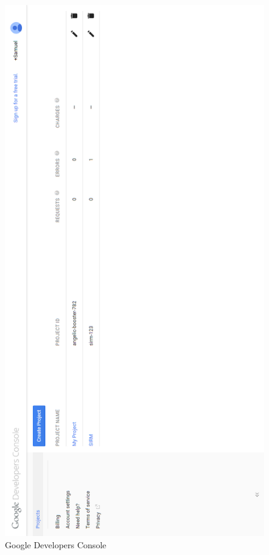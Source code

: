 \begin{figure}[H]
\centering
\includegraphics[scale=0.6]{Gambar/GDC.png}
\caption[Google Developers Console]{Google Developers Console} 
\label{fig:gdc}
\end{figure}

